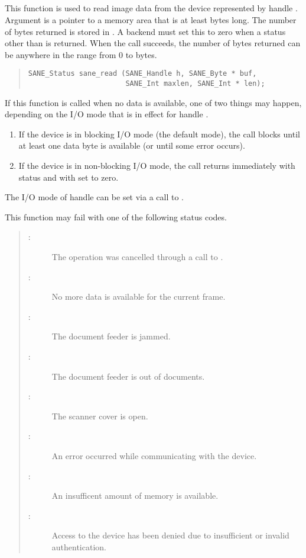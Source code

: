 \documentclass[11pt,DVIps]{report}
\begin{document}
\subsection{}

This function is used to read image data from the device represented
by handle .  Argument  is a pointer to a memory area
that is at least  bytes long.  The number of bytes
returned is stored in .  A backend must set this to zero
when a status other than  is returned.
When the call succeeds, the number of bytes returned can be anywhere in
the range from 0 to  bytes.
\begin{quote}
\begin{verbatim}
SANE_Status sane_read (SANE_Handle h, SANE_Byte * buf,
                       SANE_Int maxlen, SANE_Int * len);
\end{verbatim}
\end{quote}
If this function is called when no data is available, one of two
things may happen, depending on the I/O mode that is in effect for
handle .
\begin{enumerate}
\item If the device is in blocking I/O mode (the default mode), the
  call blocks until at least one data byte is available (or until some
  error occurs).

\item If the device is in non-blocking I/O mode, the call returns
  immediately with status  and with
   set to zero.
\end{enumerate}
The I/O mode of handle  can be set via a call to
.

This function may fail with one of the following status codes.
\begin{quote}
\begin{description}
\item[:] The operation was cancelled through
  a call to .
\item[:] No more data is available for the
  current frame.
\item[:] The document feeder is jammed.
\item[:] The document feeder is out of
  documents.
\item[:] The scanner cover is open.
\item[:] An error occurred while communicating
  with the device.
\item[:] An insufficent amount of memory
  is available.
\item[:] Access to the device has
  been denied due to insufficient or invalid authentication.
\end{description}
\end{quote}
\end{document}
